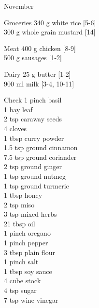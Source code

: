 \begin{menu}{November}
\begin{shoppinglist}{Groceries}
      340 g white rice {\scriptsize[5-6]}\\
      300 g whole grain mustard {\scriptsize[14]}\\
      \end{shoppinglist}%
      \par\vfil %
      \begin{shoppinglist}{Meat}
      400 g chicken {\scriptsize[8-9]}\\
      500 g sausages {\scriptsize[1-2]}\\
      \end{shoppinglist}%
      \begin{shoppinglist}{Dairy}
      25 g butter {\scriptsize[1-2]}\\
      900 ml milk {\scriptsize[3-4, 10-11]}\\
      \end{shoppinglist}%
      \par\vfil %
      \vfil\clearpage %
      \begin{shoppinglist}{Check}
      1 pinch basil \\
      1  bay leaf \\
      2 tsp caraway seeds \\
      4  cloves \\
      1 tbsp curry powder \\
      1.5 tsp ground cinnamon \\
      7.5 tsp ground coriander \\
      2 tsp ground ginger \\
      1 tsp ground nutmeg \\
      1 tsp ground turmeric \\
      1 tbsp honey \\
      2 tsp miso \\
      3 tsp mixed herbs \\
      21 tbsp oil \\
      1 pinch oregano \\
      1 pinch pepper \\
      3 tbsp plain flour \\
      1 pinch salt \\
      1 tbsp soy sauce \\
      4 cube stock \\
      4 tsp sugar \\
      7 tsp wine vinegar \\
      \end{shoppinglist}%

\end{menu}
